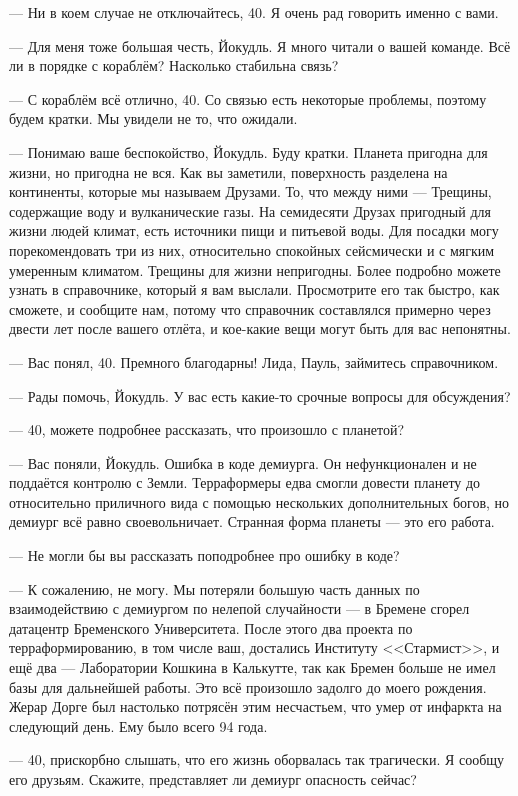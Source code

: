 \documentclass[a4paper,10pt,fleqn]{book}\usepackage{polyglossia}\setdefaultlanguage{english}\setotherlanguage{russian}\defaultfontfeatures{Ligatures=TeX,Mapping=tex-text}\usepackage{xcolor}\definecolor{lightgray}{HTML}{bbbbbb}\color{lightgray}\newcommand{\ml}[3]{\textcolor{black}{#3}}
\begin{document}
--- Ни в коем случае не отключайтесь, 40.
Я очень рад говорить именно с вами.

--- Для меня тоже большая честь, Йокудль.
Я много читали о вашей команде.
Всё ли в порядке с кораблём?
Насколько стабильна связь?

--- С кораблём всё отлично, 40.
Со связью есть некоторые проблемы, поэтому будем кратки.
Мы увидели не то, что ожидали.

--- Понимаю ваше беспокойство, Йокудль.
Буду кратки.
Планета пригодна для жизни, но пригодна не вся.
Как вы заметили, поверхность разделена на континенты, которые мы называем Друзами.
То, что между ними --- Трещины, содержащие воду и вулканические газы.
На семидесяти Друзах пригодный для жизни людей климат, есть источники пищи и питьевой воды.
Для посадки могу порекомендовать три из них, относительно спокойных сейсмически и с мягким умеренным климатом.
Трещины для жизни непригодны.
Более подробно можете узнать в справочнике, который я вам выслали.
Просмотрите его так быстро, как сможете, и сообщите нам, потому что справочник составлялся примерно через двести лет после вашего отлёта, и кое-какие вещи могут быть для вас непонятны.

--- Вас понял, 40.
Премного благодарны!
Лида, Пауль, займитесь справочником.

--- Рады помочь, Йокудль.
У вас есть какие-то срочные вопросы для обсуждения?

--- 40, можете подробнее рассказать, что произошло с планетой?

--- Вас поняли, Йокудль.
Ошибка в коде демиурга.
Он нефункционален и не поддаётся контролю с Земли.
Терраформеры едва смогли довести планету до относительно приличного вида с помощью нескольких дополнительных богов, но демиург всё равно своевольничает.
Странная форма планеты --- это его работа.

--- Не могли бы вы рассказать поподробнее про ошибку в коде?

--- К сожалению, не могу.
Мы потеряли большую часть данных по взаимодействию с демиургом по нелепой случайности --- в Бремене сгорел датацентр Бременского Университета.
После этого два проекта по терраформированию, в том числе ваш, достались Институту <<Стармист>>, и ещё два --- Лаборатории Кошкина в Калькутте, так как Бремен больше не имел базы для дальнейшей работы.
Это всё произошло задолго до моего рождения.
Жерар Дорге был настолько потрясён этим несчастьем, что умер от инфаркта на следующий день.
Ему было всего 94 года.

--- 40, прискорбно слышать, что его жизнь оборвалась так трагически.
Я сообщу его друзьям.
Скажите, представляет ли демиург опасность сейчас?
\end{document}
